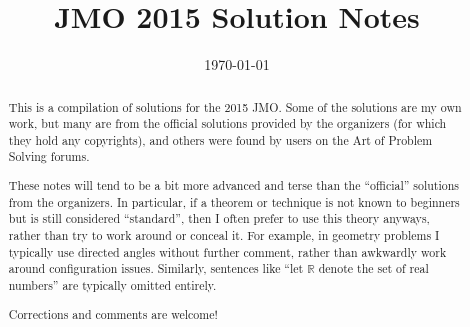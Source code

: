 \documentclass[11pt]{scrartcl}
\title{JMO 2015 Solution Notes}
\date{\today}
\begin{document}
\maketitle

\begin{abstract}
This is a compilation of solutions
for the 2015 JMO.
Some of the solutions are my own work,
but many are from the official solutions provided by the organizers
(for which they hold any copyrights),
and others were found by users on the Art of Problem Solving forums.

These notes will tend to be a bit more advanced and terse than the ``official''
solutions from the organizers.
In particular, if a theorem or technique is not known to beginners
but is still considered ``standard'', then I often prefer to
use this theory anyways, rather than try to work around or conceal it.
For example, in geometry problems I typically use directed angles
without further comment, rather than awkwardly work around configuration issues.
Similarly, sentences like ``let $\mathbb{R}$ denote the set of real numbers''
are typically omitted entirely.

Corrections and comments are welcome!
\end{abstract}

\tableofcontents
\newpage

\addtocounter{section}{-1}
\end{document}
